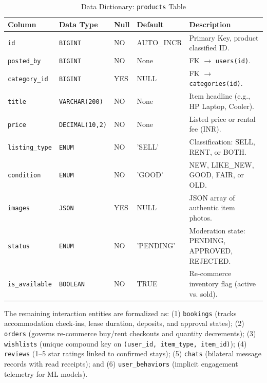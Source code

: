 \begin{table}[htbp]
\centering
\caption{Data Dictionary: \texttt{products} Table}
\label{tab:dict_products}
\footnotesize
\begin{tabularx}{\textwidth}{lp{2.5cm}lp{2.0cm}X}
\toprule
\textbf{Column} & \textbf{Data Type} & \textbf{Null} & \textbf{Default} & \textbf{Description} \\
\midrule
\texttt{id} & \texttt{BIGINT} & NO & AUTO\_INCR & Primary Key, product classified ID. \\
\texttt{posted\_by} & \texttt{BIGINT} & NO & None & FK $\rightarrow$ \texttt{users(id)}. \\
\texttt{category\_id} & \texttt{BIGINT} & YES & NULL & FK $\rightarrow$ \texttt{categories(id)}. \\
\texttt{title} & \texttt{VARCHAR(200)} & NO & None & Item headline (e.g., HP Laptop, Cooler). \\
\texttt{price} & \texttt{DECIMAL(10,2)}& NO & None & Listed price or rental fee (INR). \\
\texttt{listing\_type} & \texttt{ENUM} & NO & 'SELL' & Classification: SELL, RENT, or BOTH. \\
\texttt{condition} & \texttt{ENUM} & NO & 'GOOD' & NEW, LIKE\_NEW, GOOD, FAIR, or OLD. \\
\texttt{images} & \texttt{JSON} & YES & NULL & JSON array of authentic item photos. \\
\texttt{status} & \texttt{ENUM} & NO & 'PENDING' & Moderation state: PENDING, APPROVED, REJECTED. \\
\texttt{is\_available} & \texttt{BOOLEAN} & NO & TRUE & Re-commerce inventory flag (active vs. sold). \\
\bottomrule
\end{tabularx}
\end{table}

The remaining interaction entities are formalized as: (1) \texttt{bookings} (tracks accommodation check-ins, lease duration, deposits, and approval states); (2) \texttt{orders} (governs re-commerce buy/rent checkouts and quantity decrements); (3) \texttt{wishlists} (unique compound key on \texttt{(user\_id, item\_type, item\_id)}); (4) \texttt{reviews} (1--5 star ratings linked to confirmed stays); (5) \texttt{chats} (bilateral message records with read receipts); and (6) \texttt{user\_behaviors} (implicit engagement telemetry for ML models).

